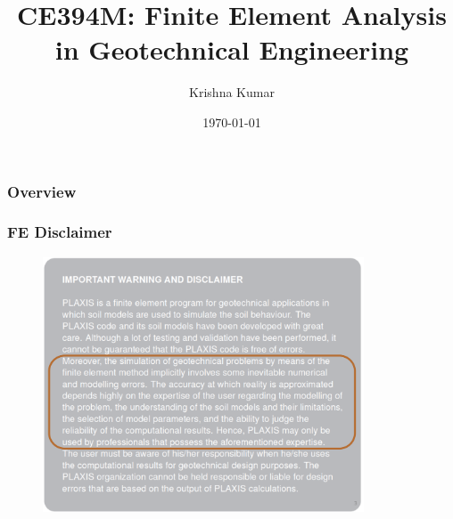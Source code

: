\documentclass[notes]{beamer}
\title[CE394M: FEM Geo - case-study]{CE394M: Finite Element Analysis in Geotechnical Engineering}
\author{Krishna Kumar} %
\institute[UT Austin] %
{
University of Texas at Austin \\
\medskip
\textit{
  \url{krishnak@utexas.edu}} %
}
\date{\today} %
\begin{document}
\begin{frame}
\titlepage %
\end{frame}

\begin{frame}
 \frametitle{Overview}
 \tableofcontents
\end{frame}

\begin{frame}
\frametitle{FE Disclaimer}
\begin{figure}[ht]
	\centering
	\includegraphics[width=0.85\textwidth]{figs/plaxis-disclaimer.png}
\end{figure}
\end{frame}

\end{document}
